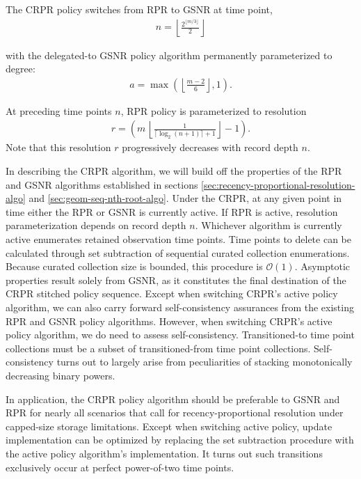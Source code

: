 The CRPR policy switches from RPR to GSNR at time point,
\begin{align*}
n = \left\lfloor \frac{2^{\lfloor m/3 \rfloor}}{2} \right\rfloor
\end{align*}

with the delegated-to GSNR policy algorithm permanently parameterized to degree:
\begin{align*}
a = \max \left(
  \left\lfloor \frac{m - 2}{6} \right\rfloor,
  1
\right).
\end{align*}

At preceding time points $n$, RPR policy is parameterized to resolution
\begin{align*}
r = \left(
  m \,
  \left\lfloor
  \frac{1}{\lceil \log_2(n + 1) \rceil + 1}
  \right\rfloor
  - 1
\right).
\end{align*}
Note that this resolution $r$ progressively decreases with record depth $n$.

In describing the CRPR algorithm, we will build off the properties of the RPR and GSNR algorithms established in sections \ref{sec:recency-proportional-resolution-algo} and \ref{sec:geom-seq-nth-root-algo}.
Under the CRPR, at any given point in time either the RPR or GSNR is currently active.
If RPR is active, resolution parameterization depends on record depth $n$.
Whichever algorithm is currently active enumerates retained observation time points.
Time points to delete can be calculated through set subtraction of sequential curated collection enumerations.
Because curated collection size is bounded, this procedure is $\mathcal{O}(1)$.
Asymptotic properties result solely from GSNR, as it constitutes the final destination of the CRPR stitched policy sequence.
Except when switching CRPR's active policy algorithm, we can also carry forward self-consistency assurances from the existing RPR and GSNR policy algorithms.
However, when switching CRPR's active policy algorithm, we do need to assess self-consistency.
Transitioned-to time point collections must be a subset of transitioned-from time point collections.
Self-consistency turns out to largely arise from peculiarities of stacking monotonically decreasing binary powers.


In application, the CRPR policy algorithm should be preferable to GSNR and RPR for nearly all scenarios that call for recency-proportional resolution under capped-size storage limitations.
Except when switching active policy, update implementation can be optimized by replacing the set subtraction procedure with the active policy algorithm's implementation.
It turns out such transitions exclusively occur at perfect power-of-two time points.
